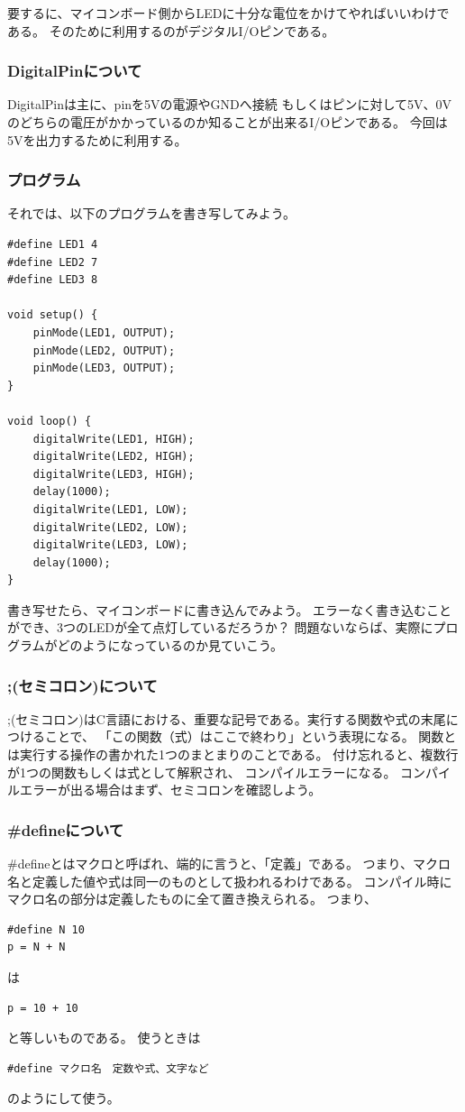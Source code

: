 \documentclass[uplatex]{jsarticle}
\begin{document}
要するに、マイコンボード側からLEDに十分な電位をかけてやればいいわけである。
そのために利用するのがデジタルI/Oピンである。

\subsubsection{DigitalPinについて}
DigitalPinは主に、pinを5Vの電源やGNDへ接続
もしくはピンに対して5V、0Vのどちらの電圧がかかっているのか知ることが出来るI/Oピンである。
今回は5Vを出力するために利用する。

\subsubsection{プログラム}
それでは、以下のプログラムを書き写してみよう。
\begin{lstlisting}[basicstyle=\ttfamily\footnotesize, frame=single,caption=Lチカプログラム]
#define LED1 4
#define LED2 7
#define LED3 8
    
void setup() {
    pinMode(LED1, OUTPUT);
    pinMode(LED2, OUTPUT);
    pinMode(LED3, OUTPUT);
}
    
void loop() {
    digitalWrite(LED1, HIGH);
    digitalWrite(LED2, HIGH);
    digitalWrite(LED3, HIGH);
    delay(1000);
    digitalWrite(LED1, LOW);
    digitalWrite(LED2, LOW);
    digitalWrite(LED3, LOW);
    delay(1000);
}    
\end{lstlisting}
書き写せたら、マイコンボードに書き込んでみよう。
エラーなく書き込むことができ、3つのLEDが全て点灯しているだろうか？
問題ないならば、実際にプログラムがどのようになっているのか見ていこう。
\subsubsection{;(セミコロン)について}
;(セミコロン)はC言語における、重要な記号である。実行する関数や式の末尾につけることで、
「この関数（式）はここで終わり」という表現になる。
関数とは実行する操作の書かれた1つのまとまりのことである。
付け忘れると、複数行が1つの関数もしくは式として解釈され、
コンパイルエラーになる。
コンパイルエラーが出る場合はまず、セミコロンを確認しよう。
\subsubsection{\#defineについて}
\#defineとはマクロと呼ばれ、端的に言うと、「定義」である。
つまり、マクロ名と定義した値や式は同一のものとして扱われるわけである。
コンパイル時にマクロ名の部分は定義したものに全て置き換えられる。
つまり、
\begin{lstlisting}[basicstyle=\ttfamily\footnotesize, frame=single]
#define N 10
p = N + N
\end{lstlisting}
は
\begin{lstlisting}[basicstyle=\ttfamily\footnotesize, frame=single]
p = 10 + 10
\end{lstlisting}
と等しいものである。
使うときは
\begin{lstlisting}[basicstyle=\ttfamily\footnotesize, frame=single]
#define マクロ名　定数や式、文字など
\end{lstlisting}
のようにして使う。
\end{document}
